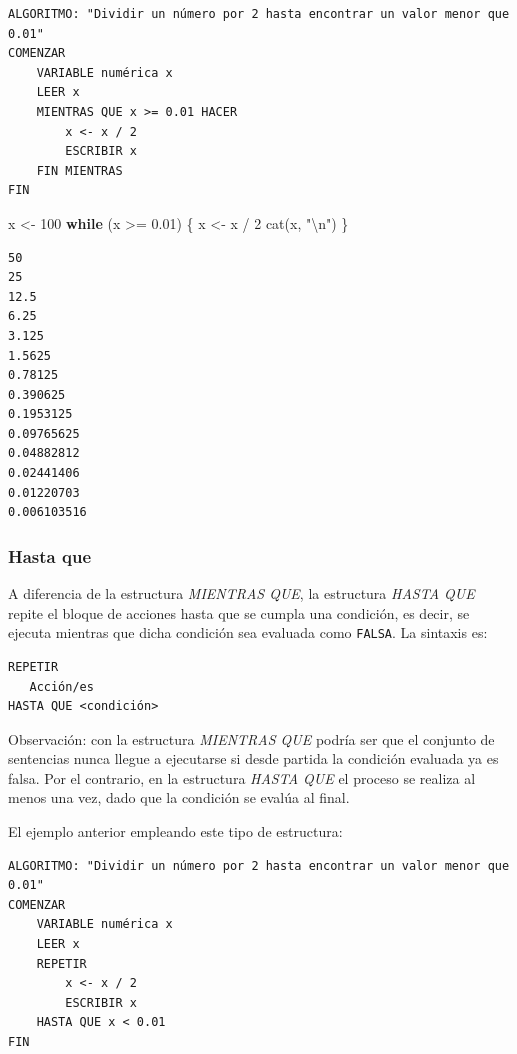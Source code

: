 \documentclass[
]{book}
\newenvironment{Shaded}{\begin{snugshade}}{\end{snugshade}}
\newcommand{\ControlFlowTok}[1]{\textcolor[rgb]{0.13,0.29,0.53}{\textbf{#1}}}
\newcommand{\DecValTok}[1]{\textcolor[rgb]{0.00,0.00,0.81}{#1}}
\newcommand{\FloatTok}[1]{\textcolor[rgb]{0.00,0.00,0.81}{#1}}
\newcommand{\FunctionTok}[1]{\textcolor[rgb]{0.00,0.00,0.00}{#1}}
\newcommand{\NormalTok}[1]{#1}
\newcommand{\OtherTok}[1]{\textcolor[rgb]{0.56,0.35,0.01}{#1}}
\newcommand{\SpecialCharTok}[1]{\textcolor[rgb]{0.00,0.00,0.00}{#1}}
\newcommand{\StringTok}[1]{\textcolor[rgb]{0.31,0.60,0.02}{#1}}
\begin{document}
\begin{verbatim}
ALGORITMO: "Dividir un número por 2 hasta encontrar un valor menor que 0.01"
COMENZAR
    VARIABLE numérica x
    LEER x
    MIENTRAS QUE x >= 0.01 HACER
        x <- x / 2
        ESCRIBIR x
    FIN MIENTRAS
FIN
\end{verbatim}

\begin{Shaded}
\begin{Highlighting}[]
\NormalTok{x }\OtherTok{\textless{}{-}} \DecValTok{100}
\ControlFlowTok{while}\NormalTok{ (x }\SpecialCharTok{\textgreater{}=} \FloatTok{0.01}\NormalTok{) \{}
\NormalTok{    x }\OtherTok{\textless{}{-}}\NormalTok{ x }\SpecialCharTok{/} \DecValTok{2}
    \FunctionTok{cat}\NormalTok{(x, }\StringTok{"}\SpecialCharTok{\textbackslash{}n}\StringTok{"}\NormalTok{)}
\NormalTok{\}}
\end{Highlighting}
\end{Shaded}

\begin{verbatim}
50 
25 
12.5 
6.25 
3.125 
1.5625 
0.78125 
0.390625 
0.1953125 
0.09765625 
0.04882812 
0.02441406 
0.01220703 
0.006103516 
\end{verbatim}

\hypertarget{hasta-que}{%
\subsubsection{Hasta que}\label{hasta-que}}

A diferencia de la estructura \emph{MIENTRAS QUE}, la estructura \emph{HASTA QUE} repite el bloque de acciones hasta que se cumpla una condición, es decir, se ejecuta mientras que dicha condición sea evaluada como \texttt{FALSA}. La sintaxis es:

\begin{verbatim}
REPETIR
   Acción/es
HASTA QUE <condición>
\end{verbatim}

Observación: con la estructura \emph{MIENTRAS QUE} podría ser que el conjunto de sentencias nunca llegue a ejecutarse si desde partida la condición evaluada ya es falsa. Por el contrario, en la estructura \emph{HASTA QUE} el proceso se realiza al menos una vez, dado que la condición se evalúa al final.

El ejemplo anterior empleando este tipo de estructura:

\begin{verbatim}
ALGORITMO: "Dividir un número por 2 hasta encontrar un valor menor que 0.01"
COMENZAR
    VARIABLE numérica x
    LEER x
    REPETIR
        x <- x / 2
        ESCRIBIR x
    HASTA QUE x < 0.01
FIN
\end{verbatim}
\end{document}
